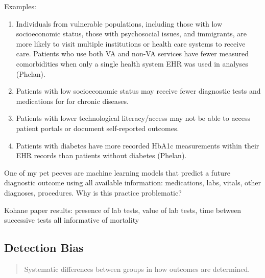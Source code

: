 Examples:
\begin{enumerate}
\item Individuals from vulnerable populations, including those with low socioeconomic status, those with psychosocial issues, and immigrants, are more likely to visit multiple institutions or health care systems to receive care. Patients who use both VA and non-VA services have fewer measured comorbidities when only a single health system EHR was used in analyses (Phelan). 
\item Patients with low socioeconomic status may receive fewer diagnostic tests and medications for for chronic diseases.  %
\item Patients with lower technological literacy/access may not be able to access patient portals or document self-reported outcomes. 
\item Patients with diabetes have more recorded HbA1c measurements within their EHR records than patients without diabetes (Phelan). 
\end{enumerate}

\begin{question}{}
One of my pet peeves are machine learning models that predict a future diagnostic outcome using all available information: medications, labs, vitals, other diagnoses, procedures. Why is this practice problematic?
\end{question}

Kohane paper results: presence of lab tests, value of lab tests, time between successive tests all informative of mortality

\subsection{Detection Bias}

\begin{quote}{}
Systematic differences between groups in how outcomes are determined.
\end{quote}



